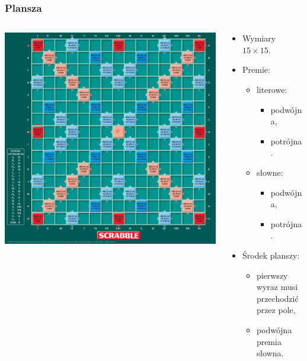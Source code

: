 \documentclass[10pt,a4paper]{beamer}
\begin{document}
\begin{frame}
	\frametitle{Plansza}
	
	\begin{columns}[onlytextwidth]
		\begin{column}{0.5\textwidth}
			\includegraphics[scale=0.17]{graphics/board.jpg}
		\end{column}
		\begin{column}{0.5\textwidth}
			\begin{itemize}
				\item Wymiary $15 \times 15$.
				\item Premie:
					\begin{itemize}
						\item literowe:
							\begin{itemize}
								\item podwójna,
								\item potrójna.
							\end{itemize}
						\item słowne:
							\begin{itemize}
								\item podwójna,
								\item potrójna.
							\end{itemize}
					\end{itemize}
				\item Środek planszy:
					\begin{itemize}
						\item pierwszy wyraz musi przechodzić przez pole,
						\item podwójna premia słowna.
					\end{itemize}
			\end{itemize}
		\end{column}
	\end{columns}
\end{frame}
\end{document}
